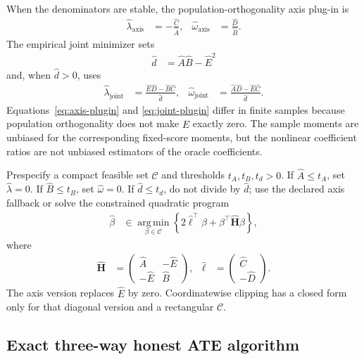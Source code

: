 When the denominators are stable, the population-orthogonality axis plug-in is
\begin{align}
\widehat\lambda_{\mathrm{axis}}
&=
-\frac{\widehat C}{\widehat A},
&
\widehat\omega_{\mathrm{axis}}
&=
\frac{\widehat D}{\widehat B}.
\label{eq:axis-plugin}
\end{align}
The empirical joint minimizer sets
\begin{align}
\widehat d
&=
\widehat A\widehat B-\widehat E^2
\end{align}
and, when $\widehat d>0$, uses
\begin{align}
\widehat\lambda_{\mathrm{joint}}
&=
\frac{
\widehat E\widehat D-\widehat B\widehat C
}{\widehat d},
&
\widehat\omega_{\mathrm{joint}}
&=
\frac{
\widehat A\widehat D-\widehat E\widehat C
}{\widehat d}.
\label{eq:joint-plugin}
\end{align}
Equations~\eqref{eq:axis-plugin} and \eqref{eq:joint-plugin} differ in finite samples because population orthogonality does not make $\widehat E$ exactly zero. The sample moments are unbiased for the corresponding fixed-score moments, but the nonlinear coefficient ratios are not unbiased estimators of the oracle coefficients.

Prespecify a compact feasible set $\mathcal C$ and thresholds $t_A,t_B,t_d>0$. If $\widehat A\leq t_A$, set $\widehat\lambda=0$. If $\widehat B\leq t_B$, set $\widehat\omega=0$. If $\widehat d\leq t_d$, do not divide by $\widehat d$; use the declared axis fallback or solve the constrained quadratic program
\begin{align}
\widehat\beta
&\in
\operatorname*{arg\,min}_{\beta\in\mathcal C}
\left\{
2\widehat\ell^\top\beta
+
\beta^\top\widehat{\mathbf H}\beta
\right\},
\label{eq:plugin-qp}
\end{align}
where
\begin{align}
\widehat{\mathbf H}
&=
\begin{pmatrix}
\widehat A&-\widehat E\\
-\widehat E&\widehat B
\end{pmatrix},
&
\widehat\ell
&=
\begin{pmatrix}
\widehat C\\-\widehat D
\end{pmatrix}.
\end{align}
The axis version replaces $\widehat E$ by zero. Coordinatewise clipping has a closed form only for that diagonal version and a rectangular $\mathcal C$.

\subsection{Exact three-way honest ATE algorithm}

